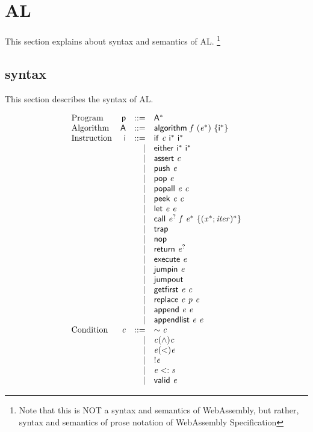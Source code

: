\section{AL}\label{sec:al}

This section explains about syntax and semantics of AL.
\footnote{Note that this is NOT a syntax and semantics of WebAssembly, but rather,
syntax and semantics of prose notation of WebAssembly Specification}

\subsection{syntax}

This section describes the syntax of AL.

\begin{minipage}{0.5\textwidth}
$$
\begin{array}{@{}lrrl@{}}
\text{Program} & \mathsf{p} &::=& {\mathsf{A}^\ast} \\
\text{Algorithm} & \mathsf{A} &::=& \mathsf{algorithm}~\mathit{f}~({\mathit{e}^\ast})~\{{\mathsf{i}^\ast}\} \\
\text{Instruction} & \mathsf{i} &::=& \mathsf{if}~\mathit{c}~{\mathsf{i}^\ast}~{\mathsf{i}^\ast} \\ &&|&
\mathsf{either}~{\mathsf{i}^\ast}~{\mathsf{i}^\ast} \\ &&|&
\mathsf{assert}~\mathit{c} \\ &&|&
\mathsf{push}~\mathit{e} \\ &&|&
\mathsf{pop}~\mathit{e} \\ &&|&
\mathsf{popall}~\mathit{e}~\mathit{c} \\ &&|&
\mathsf{peek}~\mathit{e}~\mathit{c} \\ &&|&
\mathsf{let}~\mathit{e}~\mathit{e} \\ &&|&
\mathsf{call}~{\mathit{e}^?}~\mathit{f}~{\mathit{e}^\ast}~\{{({\mathit{x}^\ast} ; \mathit{iter})^\ast}\} \\ &&|&
\mathsf{trap} \\ &&|&
\mathsf{nop} \\ &&|&
\mathsf{return}~{\mathit{e}^?} \\ &&|&
\mathsf{execute}~\mathit{e} \\ &&|&
\mathsf{jumpin}~\mathit{e} \\ &&|&
\mathsf{jumpout} \\ &&|&
\mathsf{getfirst}~\mathit{e}~\mathit{c} \\ &&|&
\mathsf{replace}~\mathit{e}~\mathit{p}~\mathit{e} \\ &&|&
\mathsf{append}~\mathit{e}~\mathit{e} \\ &&|&
\mathsf{appendlist}~\mathit{e}~\mathit{e} \\
\text{Condition} & \mathit{c} &::=& \sim\mathit{c} \\ &&|&
\mathit{c}(\wedge)\mathit{c} \\ &&|&
\mathit{e}(<)\mathit{e} \\ &&|&
!\mathit{e} \\ &&|&
\mathit{e}<:\mathit{s} \\ &&|&
\mathsf{valid}~\mathit{e} \\
\end{array}
$$
\end{minipage}
